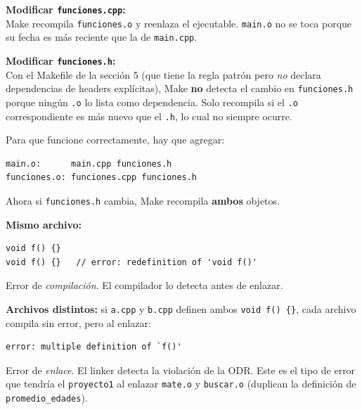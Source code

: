 \documentclass[12pt, oneside]{article}
\begin{document}
\begin{notaprofesor}
  \textbf{Modificar \texttt{funciones.cpp}:}\\
  Make recompila \texttt{funciones.o} y reenlaza el ejecutable.
  \texttt{main.o} no se toca porque su fecha es más reciente que la de
  \texttt{main.cpp}.

  \medskip
  \textbf{Modificar \texttt{funciones.h}:}\\
  Con el Makefile de la sección 5 (que tiene la regla patrón pero
  \textit{no} declara dependencias de headers explícitas), Make \textbf{no}
  detecta el cambio en \texttt{funciones.h} porque ningún \texttt{.o}
  lo lista como dependencia.  Solo recompila si el \texttt{.o}
  correspondiente es más nuevo que el \texttt{.h}, lo cual no siempre ocurre.

  Para que funcione correctamente, hay que agregar:
\begin{verbatim}
main.o:      main.cpp funciones.h
funciones.o: funciones.cpp funciones.h
\end{verbatim}
  Ahora si \texttt{funciones.h} cambia, Make recompila \textbf{ambos} objetos.
\end{notaprofesor}

\begin{notaprofesor}
  \textbf{Mismo archivo:}
\begin{verbatim}
void f() {}
void f() {}   // error: redefinition of 'void f()'
\end{verbatim}
  Error de \textit{compilación}.  El compilador lo detecta antes de enlazar.

  \medskip
  \textbf{Archivos distintos:} si \texttt{a.cpp} y \texttt{b.cpp} definen
  ambos \texttt{void f() \{\}}, cada archivo compila sin error,
  pero al enlazar:
\begin{verbatim}
error: multiple definition of `f()'
\end{verbatim}
  Error de \textit{enlace}.  El linker detecta la violación de la ODR.
  Este es el tipo de error que tendría el \texttt{proyecto1} al enlazar
  \texttt{mate.o} y \texttt{buscar.o} (duplican la definición de
  \texttt{promedio\_edades}).
\end{notaprofesor}
\end{document}
